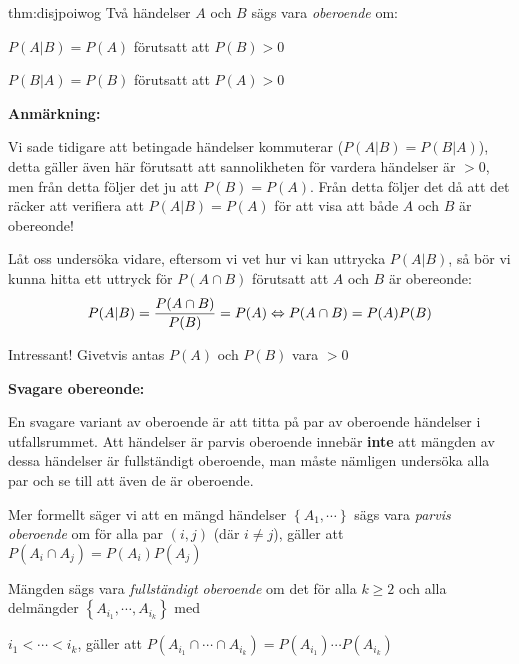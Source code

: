 \par\bigskip
\begin{theo}{thm:disjpoiwog}
  Två händelser $A$ och $B$ sägs vara \textit{oberoende} om:\par
  $P(A|B) = P(A)$ förutsatt att $P(B)>0$\par
  $P(B|A)=P(B)$ förutsatt att $P(A)>0$
\end{theo}
\par\bigskip
\noindent\textbf{Anmärkning:}\par
\noindent Vi sade tidigare att betingade händelser kommuterar ($P(A|B)=P(B|A)$), detta gäller även här förutsatt att sannolikheten för vardera händelser är $>0$, men från detta följer det ju att $P(B)=P(A)$. Från detta följer det då att det räcker att verifiera att $P(A|B)=P(A)$ för att visa att både $A$ och $B$ är obereonde!
\par\bigskip
\noindent Låt oss undersöka vidare, eftersom vi vet hur vi kan uttrycka $P(A|B)$, så bör vi kunna hitta ett uttryck för $P(A\cap B)$ förutsatt att $A$ och $B$ är obereonde:
\begin{equation*}
  \begin{gathered}
    P(A|B) = \dfrac{P(A\cap B)}{P(B)} = P(A) \Leftrightarrow P(A\cap B) = P(A)P(B)
  \end{gathered}
\end{equation*}
\par\bigskip
\noindent Intressant! Givetvis antas $P(A)$ och $P(B)$ vara $>0$
\par\bigskip
\noindent\textbf{Svagare obereonde:}\par
\noindent En svagare variant av oberoende är att titta på par av oberoende händelser i utfallsrummet. Att händelser är parvis oberoende innebär \textbf{inte} att mängden av dessa händelser är fullständigt oberoende, man måste nämligen undersöka alla par och se till att även de är oberoende.\par\bigskip
\noindent Mer formellt säger vi att en mängd händelser $\left\{A_1,\cdots\right\}$ sägs vara \textit{parvis oberoende} om för alla par $(i,j)$ (där $i\neq j $), gäller att $P(A_i\cap A_j)=P(A_i)P(A_j)$\par
\noindent Mängden sägs vara \textit{fullständigt oberoende} om det för alla $k\geq2$ och alla delmängder $\left\{A_{i_1},\cdots, A_{i_k}\right\}$ med\par\noindent $i_1<\cdots<i_k$, gäller att $P(A_{i_1}\cap\cdots\cap A_{i_k}) = P(A_{i_1})\cdots P(A_{i_k})$

